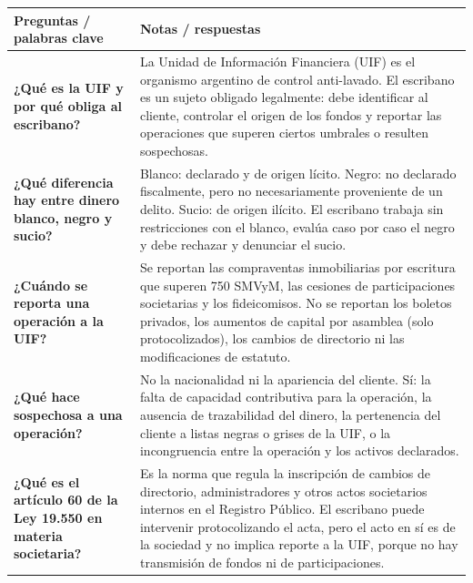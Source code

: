 \documentclass[12pt,oneside]{book}
\begin{document}
\begin{table}[H]
\centering
\begin{tabularx}{\textwidth}{
    >{\raggedright\arraybackslash}p{}
    >{\raggedright\arraybackslash}X
}
\toprule
\textbf{Preguntas / palabras clave} & \textbf{Notas / respuestas} \\
\midrule

\textbf{¿Qué es la UIF y por qué obliga al escribano?} &
La Unidad de Información Financiera (UIF) es el organismo argentino de control anti-lavado. El escribano es un sujeto obligado legalmente: debe identificar al cliente, controlar el origen de los fondos y reportar las operaciones que superen ciertos umbrales o resulten sospechosas. \\

\textbf{¿Qué diferencia hay entre dinero blanco, negro y sucio?} &
Blanco: declarado y de origen lícito. Negro: no declarado fiscalmente, pero no necesariamente proveniente de un delito. Sucio: de origen ilícito. El escribano trabaja sin restricciones con el blanco, evalúa caso por caso el negro y debe rechazar y denunciar el sucio. \\

\textbf{¿Cuándo se reporta una operación a la UIF?} &
Se reportan las compraventas inmobiliarias por escritura que superen 750 SMVyM, las cesiones de participaciones societarias y los fideicomisos. No se reportan los boletos privados, los aumentos de capital por asamblea (solo protocolizados), los cambios de directorio ni las modificaciones de estatuto. \\

\textbf{¿Qué hace sospechosa a una operación?} &
No la nacionalidad ni la apariencia del cliente. Sí: la falta de capacidad contributiva para la operación, la ausencia de trazabilidad del dinero, la pertenencia del cliente a listas negras o grises de la UIF, o la incongruencia entre la operación y los activos declarados. \\

\textbf{¿Qué es el artículo 60 de la Ley 19.550 en materia societaria?} &
Es la norma que regula la inscripción de cambios de directorio, administradores y otros actos societarios internos en el Registro Público. El escribano puede intervenir protocolizando el acta, pero el acto en sí es de la sociedad y no implica reporte a la UIF, porque no hay transmisión de fondos ni de participaciones. \\

\midrule


\end{tabularx}
\end{table}
\end{document}
